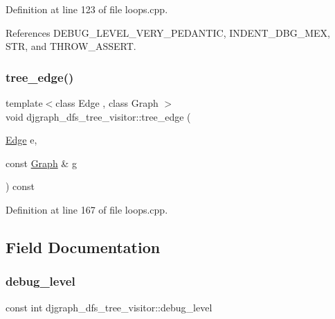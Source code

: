 Definition at line 123 of file loops.\+cpp.



References D\+E\+B\+U\+G\+\_\+\+L\+E\+V\+E\+L\+\_\+\+V\+E\+R\+Y\+\_\+\+P\+E\+D\+A\+N\+T\+IC, I\+N\+D\+E\+N\+T\+\_\+\+D\+B\+G\+\_\+\+M\+EX, S\+TR, and T\+H\+R\+O\+W\+\_\+\+A\+S\+S\+E\+RT.

\mbox{\label{structdjgraph__dfs__tree__visitor_ace65845190cbcfa9406dcb86355b3ab2}} 
\subsubsection{\texorpdfstring{tree\+\_\+edge()}{tree\_edge()}}
{\footnotesize\ttfamily template$<$class Edge , class Graph $>$ \\
void djgraph\+\_\+dfs\+\_\+tree\+\_\+visitor\+::tree\+\_\+edge (\begin{DoxyParamCaption}\item[{\hyperlink{structEdge}{Edge}}]{e,  }\item[{const \hyperlink{structGraph}{Graph} \&}]{g }\end{DoxyParamCaption}) const\hspace{0.3cm}{\ttfamily [inline]}}



Definition at line 167 of file loops.\+cpp.



\subsection{Field Documentation}
\mbox{\label{structdjgraph__dfs__tree__visitor_a07ea37c00d7cf82b22ce3379ac8855f8}} 
\subsubsection{\texorpdfstring{debug\+\_\+level}{debug\_level}}
{\footnotesize\ttfamily const int djgraph\+\_\+dfs\+\_\+tree\+\_\+visitor\+::debug\+\_\+level\hspace{0.3cm}{\ttfamily [private]}}



